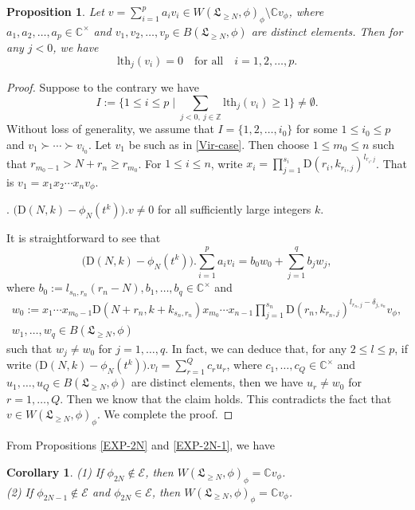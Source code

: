 \documentclass[12pt, a4paper]{amsart}
\newcommand{\C}{\mathbb{C}}
\newcommand{\Z}{\mathbb Z}
\newcommand{\rD}{\mathrm{D}}
\theoremstyle{Theorem}
\theoremstyle{Theorem}
\newtheorem{corollary}[thm]{Corollary}
\newtheorem{proposition}[thm]{Proposition}
\numberwithin{equation}{section}
\begin{document}
\begin{proposition}
Let $v=\sum_{i=1}^{p}a_{i}v_{i}\in W(\mathfrak{L}_{\geq N},\phi)_{\phi}\setminus\C v_{\phi}$,
where $a_{1},a_{2},\dots,a_{p}\in\C^{\times}$ and $v_{1},v_{2},\dots,v_{p}\in B(\mathfrak{L}_{\geq N},\phi)$
are distinct elements. Then for any $j<0$, we have
\[\mathrm{lth}_{j}(v_{i})=0\quad \text{for all}\quad i=1,2,\dots,p.\]
\end{proposition}
\begin{proof}
Suppose to the contrary we have \[I:=\{1\leq i\leq p\mid\sum_{j<0,\ j\in\Z}\mathrm{lth}_{j}(v_{i})\geq1\}\neq\emptyset.\]
Without loss of generality, we assume that $I=\{1,2,\dots,i_{0}\}$
for some $1\leq i_{0}\leq p$ and $v_{1}\succ\cdots\succ v_{i_{0}}$.
Let $v_{1}$ be such as in \eqref{Vir-case}. Then choose
$1\leq m_{0}\leq n$ such that $r_{m_0-1}> N+r_{n}\geq r_{m_0}$. For $1\leq i\leq n$, write
$x_{i}=\prod_{j=1}^{s_{i}}
\rD(r_{i},k_{r_{i},j})^{l_{r_{i},j}}$. That is $v_{1}=x_{1}x_{2}\cdots x_{n}v_{\phi}$.


\vspace{2mm}

. $\big(\rD(N,k)-\phi_{N}(t^{k})\big).v\neq0$ for all sufficiently large integers $k$.

It is straightforward to see that
\[\big(\rD(N,k)-\phi_{N}(t^{k})\big).\sum_{i=1}^{p}a_{i}v_{i}=
b_{0}w_{0}+\sum_{j=1}^{q}b_{j}w_{j},\]
where $b_{0}:=l_{s_{n},r_{n}}(r_{n}-N),b_{1},\dots,b_{q}\in\C^{\times}$ and
$$\begin{aligned}w_{0}:=x_{1}\cdots x_{m_{0}-1}\rD(N+r_{n},k+k_{s_{n},r_{n}})x_{m_{0}}\cdots x_{n-1}
\prod_{j=1}^{s_{n}}\rD(r_{n},k_{r_{n},j})^{l_{r_{n},j}-\delta_{j,s_{n}}}v_{\phi},\\ w_{1},\dots,w_{q}\in B(\mathfrak{L}_{\geq N},\phi)
\end{aligned}$$
such that $w_{j}\neq w_{0}$ for $j=1,\dots, q$. In fact, we can deduce that, for any $2\leq l\leq p$,
if write $\big(\rD(N,k)-\phi_{N}(t^{k})\big).v_{l}=\sum_{r=1}^{Q}c_{r}u_{r}$, where $c_{1},\dots,c_{Q}\in\C^{\times}$
and $u_{1},\dots,u_{Q}\in B(\mathfrak{L}_{\geq N},\phi)$ are distinct elements, then we have
$u_{r}\neq w_{0}$ for $r=1,\dots,Q$.
Then we know that the claim holds. This contradicts the fact that $v\in W(\mathfrak{L}_{\geq N},\phi)_{\phi}$.
We complete the proof.
\end{proof}
From Propositions \ref{EXP-2N} and \ref{EXP-2N-1}, we have
\begin{corollary}
(1) If $\phi_{2N}\notin\mathcal{E}$, then $W(\mathfrak{L}_{\geq N},\phi)_{\phi}=\C v_{\phi}$.\\
(2) If $\phi_{2N-1}\notin\mathcal{E}$ and $\phi_{2N}\in\mathcal{E}$, then $W(\mathfrak{L}_{\geq N},\phi)_{\phi}=\C v_{\phi}$.
\end{corollary}
\end{document}
